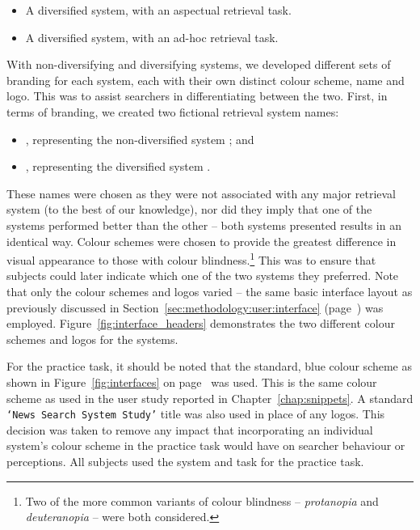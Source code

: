 \begin{itemize}
    \item{ A diversified system, with an aspectual retrieval task.}
    \item{ A diversified system, with an ad-hoc retrieval task.}
\end{itemize}

With non-diversifying and diversifying systems, we developed different sets of branding for each system, each with their own distinct colour scheme, name and logo. This was to assist searchers in differentiating between the two. First, in terms of branding, we created two fictional retrieval system names:

\begin{itemize}
    \item{\hula, representing the non-diversified system ; and}
    \item{\yoyo, representing the diversified system .}
\end{itemize}

These names were chosen as they were not associated with any major retrieval system (to the best of our knowledge), nor did they imply that one of the systems performed better than the other -- both systems presented results in an identical way. Colour schemes were chosen to provide the greatest difference in visual appearance to those with colour blindness.\footnote{Two of the more common variants of colour blindness -- \emph{protanopia} and \emph{deuteranopia} -- were both considered.} This was to ensure that subjects could later indicate which one of the two systems they preferred. Note that only the colour schemes and logos varied -- the same basic interface layout as previously discussed in Section~\ref{sec:methodology:user:interface} (page~\pageref{sec:methodology:user:interface}) was employed. Figure~\ref{fig:interface_headers} demonstrates the two different colour schemes and logos for the systems.

For the practice task, it should be noted that the standard, blue colour scheme as shown in Figure~\ref{fig:interfaces} on page~\pageref{fig:interfaces} was used. This is the same colour scheme as used in the user study reported in Chapter~\ref{chap:snippets}. A standard \texttt{`News Search System Study'} title was also used in place of any logos. This decision was taken to remove any impact that incorporating an individual system's colour scheme in the practice task would have on searcher behaviour or perceptions. All subjects used the  system and task for the practice task.

